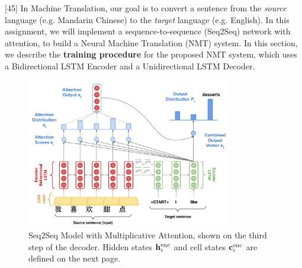 \graphicspath{ {images/} }

\newcommand{\Real}{\mathbb{R}}

\newcommand{\henc}{\bh^{\text{enc}}}
\newcommand{\hencfw}[1]{\overrightarrow{\henc_{#1}}}
\newcommand{\hencbw}[1]{\overleftarrow{\henc_{#1}}}

\newcommand{\cenc}{\bc^{\text{enc}}}
\newcommand{\cencfw}[1]{\overrightarrow{\cenc_{#1}}}
\newcommand{\cencbw}[1]{\overleftarrow{\cenc_{#1}}}

\newcommand{\hdec}{\bh^{\text{dec}}}

\newcommand{\cdec}{\bc^{\text{dec}}}

[45]
 In Machine Translation, our goal is to convert a sentence from the \textit{source} language (e.g. Mandarin Chinese) to the \textit{target} language (e.g. English). In this assignment, we will implement a sequence-to-sequence (Seq2Seq) network with attention, to build a Neural Machine Translation (NMT) system. In this section, we describe the \textbf{training procedure} for the proposed NMT system, which uses a Bidirectional LSTM Encoder and a Unidirectional LSTM Decoder.\newline

\begin{figure}[h]
    \begin{center}
        \captionsetup{width=0.8\textwidth}
        \includegraphics[width=0.8\textwidth]{images/Assignment 4 Figure.png}
        \caption{Seq2Seq Model with Multiplicative Attention, shown on the third step of the decoder. Hidden states $\henc_i$ and cell states $\cenc_i$ are defined on the next page.
        }
        \label{nmt-figure}
    \end{center}
\end{figure}

